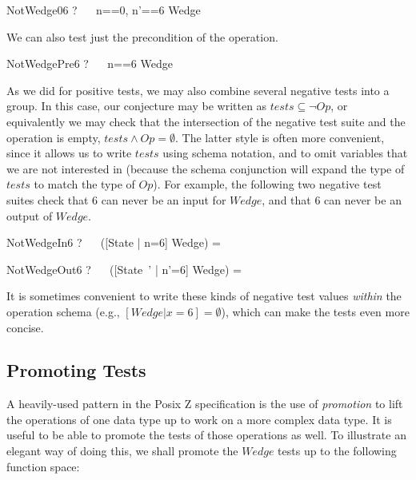 \documentclass{llncs}
\begin{document}
\begin{theorem}{NotWedge06}
\vdash? ~~ \lblot n==0, n'==6 \rblot \in \lnot Wedge
\end{theorem}

We can also test just the precondition of the operation.
\begin{theorem}{NotWedgePre6}
\vdash? ~~ \lblot n==6 \rblot \notin \pre Wedge
\end{theorem}

As we did for positive tests, we may also combine several negative tests
into a group.  In this case, our conjecture may be written as $tests
\subseteq \lnot Op$, or equivalently we may check that the intersection of
the negative test suite and the operation is empty, $tests \land Op =
\emptyset$.  The latter style is often more convenient, since it allows us
to write $tests$ using schema notation, and to omit variables that we are
not interested in (because the schema conjunction will expand the type of
$tests$ to match the type of $Op$).  For example, the following two negative
test suites check that 6 can never be an input for $Wedge$, and that 6 can
never be an output of $Wedge$.

\begin{theorem}{NotWedgeIn6}
\vdash? ~~ ([State | n=6] \land Wedge) = \emptyset
\end{theorem}

\begin{theorem}{NotWedgeOut6}
\vdash? ~~ ([State~' | n'=6] \land Wedge) = \emptyset
\end{theorem}

It is sometimes convenient to write these kinds of negative test values
\emph{within} the operation schema (e.g., $[Wedge | x=6] = \emptyset$),
which can make the tests even more concise.


\subsection{Promoting Tests}

A heavily-used pattern in the Posix Z specification is the use of
\emph{promotion} to lift the operations of one data type up to work on a
more complex data type.  It is useful to be able to promote the tests
of those operations as well.  To illustrate an elegant way of doing this,
we shall promote the $Wedge$ tests up to the following function space:
\end{document}
